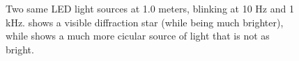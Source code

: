 \begin{figure}[htbp]
	\centering
	\caption{
  Two same LED light sources at 1.0 meters, blinking at 10 Hz and 1 kHz.
   shows a visible diffraction star (while being much brighter), while  shows a
  much more cicular source of light that is not as bright.
  }
	\label{fig:stars}
\end{figure}